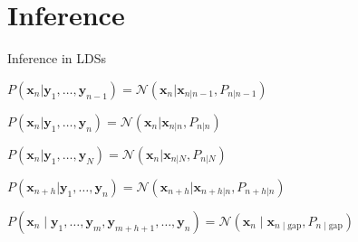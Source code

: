 \section{Inference}
\begin{frame}{Inference in LDSs}
  \setlength{\jot}{-2pt} %
  \begin{description}
    \item[Prediction] 
      $P(\mathbf{x}_n|\mathbf{y}_1,\ldots,\mathbf{y}_{n-1})=\mathcal{N}(\mathbf{x}_n|\mathbf{x}_{n|n-1},P_{n|n-1})$
      
    \item[Filtering] 
      $P(\mathbf{x}_n|\mathbf{y}_1,\ldots,\mathbf{y}_{n})=\mathcal{N}(\mathbf{x}_n|\mathbf{x}_{n|n},P_{n|n})$
      
    \item[Smoothing] 
      $P(\mathbf{x}_n|\mathbf{y}_1,\ldots,\mathbf{y}_{N})=\mathcal{N}(\mathbf{x}_n|\mathbf{x}_{n|N},P_{n|N})$
      
    \item[Forecasting] 
      $P(\mathbf{x}_{n+h}|\mathbf{y}_1,\ldots,\mathbf{y}_{n})=\mathcal{N}(\mathbf{x}_{n+h}|\mathbf{x}_{n+h|n},P_{n+h|n})$
      
    \item[Missing obs.] 
      $P(\mathbf{x}_{n} \mid \mathbf{y}_1, \ldots, \mathbf{y}_m, \mathbf{y}_{m+h+1}, \ldots, \mathbf{y}_n) = \mathcal{N}(\mathbf{x}_{n} \mid \mathbf{x}_{n \mid \text{gap}}, P_{n \mid \text{gap}})$
  \end{description}
  
  \vspace{0.4em}
  \centering
\end{frame}

